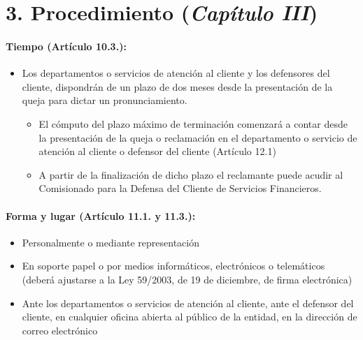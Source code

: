 \documentclass[
]{article}
\providecommand{\tightlist}{%
  \setlength{\itemsep}{0pt}\setlength{\parskip}{0pt}}
\begin{document}
\hypertarget{procedimiento-capuxedtulo-iii}{%
\section{\texorpdfstring{3. Procedimiento (\emph{Capítulo
III})}{3. Procedimiento (Capítulo III)}}\label{procedimiento-capuxedtulo-iii}}

\hypertarget{tiempo-artuxedculo-10.3.}{%
\paragraph{\texorpdfstring{Tiempo (\textbf{Artículo
10.3.}):}{Tiempo (Artículo 10.3.):}}\label{tiempo-artuxedculo-10.3.}}

\begin{itemize}
\tightlist
\item
  Los departamentos o servicios de atención al cliente y los defensores
  del cliente, dispondrán de un plazo de dos meses desde la presentación
  de la queja para dictar un pronunciamiento.

  \begin{itemize}
  \tightlist
  \item
    El cómputo del plazo máximo de terminación comenzará a contar desde
    la presentación de la queja o reclamación en el departamento o
    servicio de atención al cliente o defensor del cliente (Artículo
    12.1)
  \item
    A partir de la finalización de dicho plazo el reclamante puede
    acudir al Comisionado para la Defensa del Cliente de Servicios
    Financieros.
  \end{itemize}
\end{itemize}

\hypertarget{forma-y-lugar-artuxedculo-11.1.-y-11.3.}{%
\paragraph{\texorpdfstring{Forma y lugar (\textbf{Artículo 11.1. y
11.3.}):}{Forma y lugar (Artículo 11.1. y 11.3.):}}\label{forma-y-lugar-artuxedculo-11.1.-y-11.3.}}

\begin{itemize}
\tightlist
\item
  Personalmente o mediante representación
\item
  En soporte papel o por medios informáticos, electrónicos o telemáticos
  (deberá ajustarse a la Ley 59/2003, de 19 de diciembre, de firma
  electrónica)
\item
  Ante los departamentos o servicios de atención al cliente, ante el
  defensor del cliente, en cualquier oficina abierta al público de la
  entidad, en la dirección de correo electrónico
\end{itemize}
\end{document}
